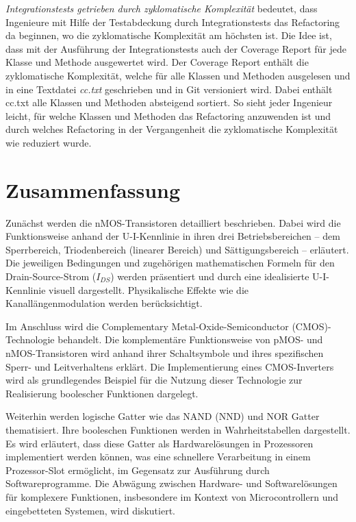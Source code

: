 \documentclass{scrarticle}
\numberwithin{equation}{section}
\begin{document}
\textit{Integrationstests getrieben durch zyklomatische Komplexität} bedeutet, dass Ingenieure mit Hilfe der Testabdeckung durch Integrationstests das Refactoring da beginnen, wo die zyklomatische Komplexität am höchsten ist. Die Idee ist, dass mit der Ausführung der Integrationstests auch der Coverage Report für jede Klasse und Methode ausgewertet wird. Der Coverage Report enthält die zyklomatische Komplexität, welche für alle Klassen und Methoden ausgelesen und in eine Textdatei \textit{cc.txt} geschrieben und in Git versioniert wird. Dabei enthält cc.txt alle Klassen und Methoden absteigend sortiert. So sieht jeder Ingenieur leicht, für welche Klassen und Methoden das Refactoring anzuwenden ist und durch welches Refactoring in der Vergangenheit die zyklomatische Komplexität wie reduziert wurde.

\section{Zusammenfassung}
Zunächst werden die nMOS-Transistoren detailliert beschrieben. Dabei wird die Funktionsweise anhand der U-I-Kennlinie in ihren drei Betriebsbereichen -- dem Sperrbereich, Triodenbereich (linearer Bereich) und Sättigungsbereich -- erläutert. Die jeweiligen Bedingungen und zugehörigen mathematischen Formeln für den Drain-Source-Strom ($I_{DS}$) werden präsentiert und durch eine idealisierte U-I-Kennlinie visuell dargestellt. Physikalische Effekte wie die Kanallängenmodulation werden berücksichtigt.

Im Anschluss wird die Complementary Metal-Oxide-Semiconductor (CMOS)-Technologie behandelt. Die komplementäre Funktionsweise von pMOS- und nMOS-Transistoren wird anhand ihrer Schaltsymbole und ihres spezifischen Sperr- und Leitverhaltens erklärt. Die Implementierung eines CMOS-Inverters wird als grundlegendes Beispiel für die Nutzung dieser Technologie zur Realisierung boolescher Funktionen dargelegt.

Weiterhin werden logische Gatter wie das NAND (NND) und NOR Gatter thematisiert. Ihre booleschen Funktionen werden in Wahrheitstabellen dargestellt. Es wird erläutert, dass diese Gatter als Hardwarelösungen in Prozessoren implementiert werden können, was eine schnellere Verarbeitung in einem Prozessor-Slot ermöglicht, im Gegensatz zur Ausführung durch Softwareprogramme. Die Abwägung zwischen Hardware- und Softwarelösungen für komplexere Funktionen, insbesondere im Kontext von Microcontrollern und eingebetteten Systemen, wird diskutiert.
\end{document}
